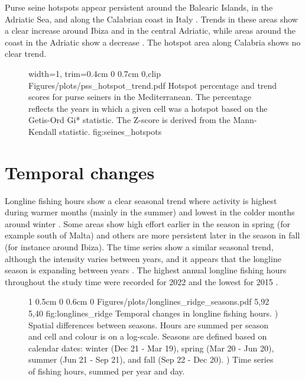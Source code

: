Purse seine hotspots appear persistent around the Balearic Islands, in the Adriatic Sea, and along
the Calabrian coast in Italy . Trends in these areas show a clear
increase around Ibiza and in the central Adriatic, while areas around the coast in the Adriatic
show a decrease . The hotspot area along Calabria shows no clear
trend.

\begin{figure}[ht]
	{width=1\linewidth, trim=0.4cm 0 0.7cm 0,clip}
	{Figures/plots/pss_hotspot_trend.pdf}
	{%
		Hotspot percentage and trend scores for purse seiners in the Mediterranean.
		The percentage reflects the years in which a given cell was a hotspot based on the Getis-Ord Gi* statistic.
		The Z-score is derived from the Mann-Kendall statistic.}
	{fig:seines_hotspots}
\end{figure}

\FloatBarrier
\section{Temporal changes}
Longline fishing hours show a clear seasonal trend where activity is highest during warmer months
(mainly in the summer) and lowest in the colder months around winter
. Some areas show high effort earlier in the season in spring (for
example south of Malta) and others are more persistent later in the season in fall (for instance
around Ibiza). The time series show a similar seasonal trend, although the intensity varies between
years, and it appears that the longline season is expanding between years
. The highest annual longline fishing hours throughout the study
time were recorded for 2022 and the lowest for 2015 .

\begin{figure}[H]
	{1\linewidth}                           %
	{0.5cm 0 0.6cm 0}                       %
	{Figures/plots/longlines_ridge_seasons.pdf} %
	{5,92}                                  %
	{5,40}                                  %
	{fig:longlines_ridge}
	{%
		Temporal changes in longline fishing hours. ) Spatial differences between seasons.
		Hours are summed per season and cell and colour is on a log-scale. Seasons are defined based on calendar dates:
		winter (Dec 21 - Mar 19), spring (Mar 20 - Jun 20), summer (Jun 21 - Sep 21), and fall (Sep 22 - Dec 20). )
		Time series of fishing hours, summed per year and day.}
\end{figure}


